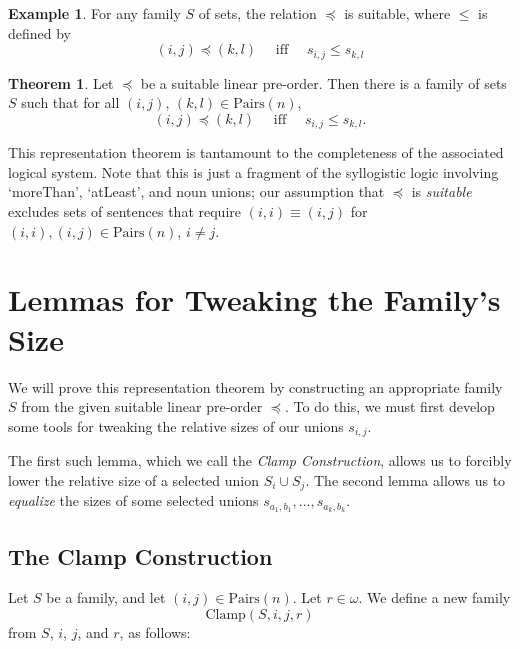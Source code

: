 \documentclass[12pt]{article}
\theoremstyle{definition}
\newtheorem{theorem}{Theorem}
\newtheorem{example}{Example}
\newcommand{\quadiff}{\quad \mbox{ iff } \quad}
\newcommand{\Pairs}{\mbox{Pairs}}
\newcommand{\Update}{\mbox{Clamp}}
\begin{document}
\begin{example} For any family $S$ of sets, the relation
$\preceq$ is suitable, where $\leq$ is defined by 
\[ (i,j) \preceq (k,l) \quadiff s_{i,j} \leq s_{k,l}
\]
\end{example}


\begin{theorem}
Let $\preceq$ be a suitable linear pre-order.
Then there is a family of sets $S$
such that for all $(i,j)$, $(k,l)\in\Pairs(n)$,
\begin{equation}
    \label{goal}
 (i,j) \preceq  (k,l) \quadiff 
 s_{i,j}\leq s_{k,l}.
 \end{equation}
 \label{theorem-thoughts}
 \end{theorem}
 
 This representation theorem is tantamount to the completeness of the
 associated logical system.  Note that this is just a fragment of the syllogistic logic involving `moreThan', `atLeast', and noun unions; our assumption that $\preceq$ is \emph{suitable} excludes sets of sentences that require $(i, i) \equiv (i, j)$ for $(i, i), (i, j) \in \Pairs(n)$, $i \ne j$.

\section{Lemmas for Tweaking the Family's Size}

We will prove this representation theorem by constructing an appropriate family $S$ from the given suitable linear pre-order $\preceq$.  To do this, we must first develop some tools for tweaking the relative sizes of our unions $s_{i, j}$.

The first such lemma, which we call the \emph{Clamp Construction}, allows us to forcibly lower the relative size of a selected union $S_i \cup S_j$.
The second lemma allows us to \emph{equalize} the sizes of some selected unions $s_{a_1, b_1}, \ldots, s_{a_k, b_k}$.

\subsection{The Clamp Construction}
 Let $S$ be a  family,
 and let $(i,j)\in\Pairs(n)$.
 Let $r\in \omega$.
 We define a new family 
 \[ \Update(S,i,j,r)\]
 from $S$, $i$, $j$, and $r$, as follows:
\end{document}
